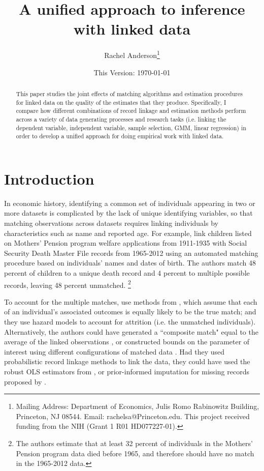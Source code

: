 \documentclass[12pt]{article}
\title{\singlespacing A unified approach to inference with linked data}
\author{Rachel Anderson\thanks{Mailing Address: Department of Economics, Julis Romo Rabinowitz Building,
Princeton, NJ 08544. Email: rachelsa@Princeton.edu.
This project received funding from the NIH (Grant 1 R01 HD077227-01). }}
\date{This Version: \today}
\begin{document}
\maketitle


\begin{abstract}
\singlespacing
\noindent This paper studies the joint effects of matching algorithms and estimation procedures for linked data on the quality of the estimates that they produce.  Specifically, I compare how different combinations of record linkage and estimation methods perform across a variety of data generating processes and research tasks (i.e. linking the dependent variable, independent variable, sample selection, GMM, linear regression) in order to develop a unified approach for doing empirical work with linked data.  \end{abstract}


\section{Introduction}
In economic history, identifying a common set of individuals appearing in two or more datasets is complicated by the lack of unique identifying variables, so that matching observations across datasets requires linking individuals by characteristics such as name and reported age.  For example, \cite{aizer2016} link children listed on Mothers' Pension program welfare applications from 1911-1935 with Social Security Death Master File records from 1965-2012 using an automated matching procedure based on individuals' names and dates of birth.  The authors match 48 percent of children to a unique death record and 4 percent to multiple possible records, leaving 48 percent unmatched.  \footnote{The authors estimate that at least 32 percent of individuals in the Mothers' Pension program data died before 1965, and therefore should have no match in the 1965-2012 data.}  

 To account for the multiple matches, \cite{aizer2016} use methods from \cite{ahl2019}, which assume that each of an individual's associated outcomes is equally likely to be the true match; and they use hazard models to account for attrition (i.e. the unmatched individuals).  Alternatively, the authors could have generated a ``composite match" equal to the average of the linked observations \citep{bleakley2016}, or constructed bounds on the parameter of interest using different configurations of matched data \citep{nq2015}.   Had they used probabilistic record linkage methods to link the data, they could have used the robust OLS estimators from \cite{lahiri05}, or prior-informed imputation for missing records proposed by \cite{Goldstein2012}.  
\end{document}
